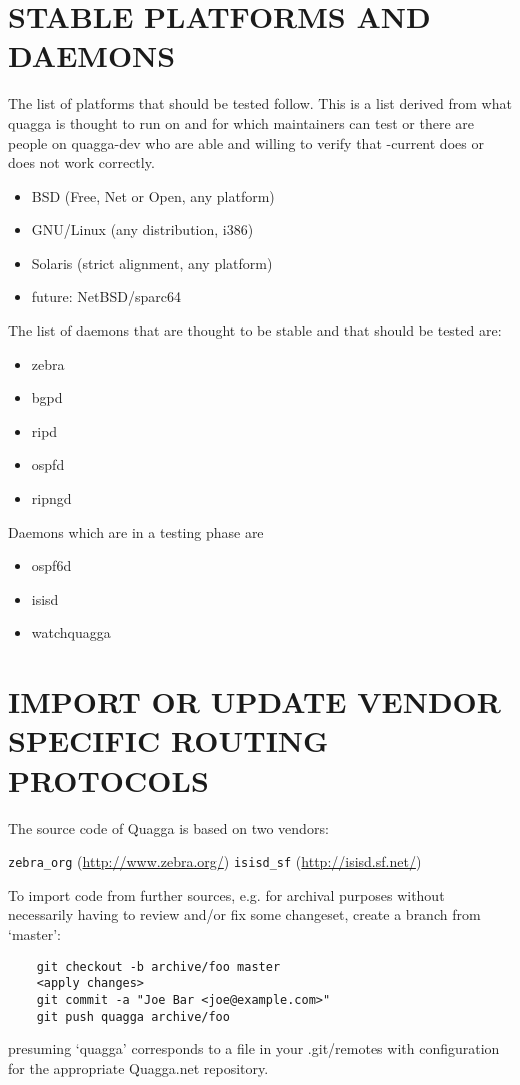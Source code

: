 \documentclass[oneside]{article}
\begin{document}
\section{STABLE PLATFORMS AND DAEMONS}

The list of platforms that should be tested follow.  This is a list
derived from what quagga is thought to run on and for which
maintainers can test or there are people on quagga-dev who are able
and willing to verify that -current does or does not work correctly.

\begin{itemize}
  \item BSD (Free, Net or Open, any platform)
  \item GNU/Linux (any distribution, i386)
  \item Solaris (strict alignment, any platform)
  \item future: NetBSD/sparc64
\end{itemize}

The list of daemons that are thought to be stable and that should be
tested are:

\begin{itemize}
  \item zebra
  \item bgpd
  \item ripd
  \item ospfd
  \item ripngd
\end{itemize}
Daemons which are in a testing phase are

\begin{itemize}
  \item ospf6d
  \item isisd
  \item watchquagga
\end{itemize}

\section{IMPORT OR UPDATE VENDOR SPECIFIC ROUTING PROTOCOLS}

The source code of Quagga is based on two vendors:

   \verb|zebra_org| (\url{http://www.zebra.org/})
   \verb|isisd_sf| (\url{http://isisd.sf.net/})

To import code from further sources, e.g. for archival purposes without
necessarily having to review and/or fix some changeset, create a branch from
`master':

\begin{verbatim}
	git checkout -b archive/foo master
	<apply changes>
	git commit -a "Joe Bar <joe@example.com>"
	git push quagga archive/foo
\end{verbatim}

presuming `quagga' corresponds to a file in your .git/remotes with
configuration for the appropriate Quagga.net repository.
\end{document}
